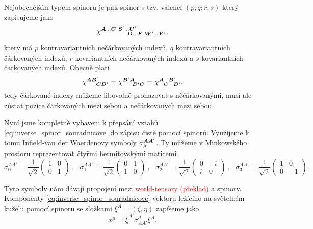 Nejobecnějším typem spinoru je pak spinor s tzv. valencí $(p, q; r, s)$ který zapisujeme jako
\begin{equation}
    \chi^{{\boldsymbol{A}}\dots {\boldsymbol{C}} ~\boldsymbol{S}'\dots \boldsymbol{U}'}_{~~~~~~~~~~~{\boldsymbol{D}}\dots \boldsymbol{F}~ \boldsymbol{W}'\dots \boldsymbol{Y}'},
\end{equation}

který má $p$ kontravariantních nečárkovaných indexů, $q$ kontravariantních čárkovaných indexů, $r$
kovariantních nečárkovaných indexů a $s$ kovariantních čarkovaných indexů. Obecně platí
\begin{equation}
    \chi^{{\boldsymbol{A}}{\boldsymbol{B}}'}_{~~~~{\boldsymbol{C}}{\boldsymbol{D}}'} = \chi^{{\boldsymbol{B}}'{\boldsymbol{A}}}_{~~~~{\boldsymbol{D}}'{\boldsymbol{C}}} = \chi^{{\boldsymbol{A}}~~{\boldsymbol{B}}'}_{~~{\boldsymbol{C}}~~{\boldsymbol{D}}'},
\end{equation}
tedy čárkované indexy můžeme libovolně prohazovat s něčárkovanými, musí ale zůstat pozice čárkovaných mezi sebou
a nečárkovaných mezi sebou.

Nyní jsme kompletně vybaveni k přepsání vztahů \eqref{eq:inverse_spinor_souradnicove} do zápisu čistě pomocí spinorů.
Využijeme k tomu Infield-van der Waerdenovy symboly $\sigma_\mu^{{\boldsymbol{A}}{\boldsymbol{A}}'}$. Ty můžeme v Minkowského prostoru reprezentovat
čtyřmi hermitovskými maticemi
\begin{equation} \scriptstyle
    \sigma_0^{AA'}=\frac{1}{\sqrt{2}}\left(\begin{smallmatrix}
        1 & 0 \\
        0 & 1
    \end{smallmatrix}\right)~,~~~ \sigma_1^{AA'}=\frac{1}{\sqrt{2}}\left(\begin{smallmatrix}
        0 & 1 \\
        1 & 0
    \end{smallmatrix}\right)~,~~~ \sigma_2^{AA'}=\frac{1}{\sqrt{2}}\left(\begin{smallmatrix}
        0 & -i \\
        i & 0
    \end{smallmatrix}\right)~,~~~ \sigma_3^{AA'}=\frac{1}{\sqrt{2}}\left(\begin{smallmatrix}
        1 & 0 \\
        0 & -1
    \end{smallmatrix}\right).
\end{equation}

Tyto symboly nám dávají propojení mezi \textcolor{red}{world-tensory (překlad)} a spinory. Komponenty
\eqref{eq:inverse_spinor_souradnicove} vektoru ležícího na světelném kuželu pomocí spinoru se
složkami $\xi^A=(\zeta, \eta)$ zapíšeme jako
\begin{equation}
    x^\mu = \bar{\xi}^{A'} \sigma_{AA'}^\mu \xi^A.
\end{equation}

